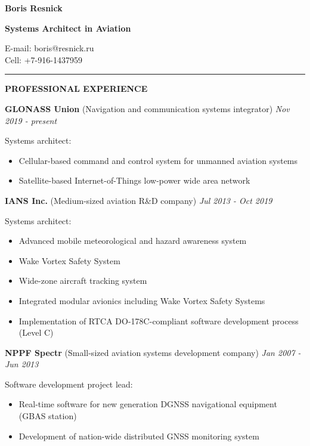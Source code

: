\documentclass[a4paper]{article}
\begin{document}
    \thispagestyle{empty}
    
	\begin{center}
		{\Large \textbf{Boris Resnick}\par}
		\vspace{2mm}
		{\large \textbf{Systems Architect in Aviation}\par}
		E-mail: boris@resnick.ru\\
		Cell: +7-916-1437959
	\end{center}
	\vspace{-2mm}
	\rule{\textwidth}{1pt}
	\vspace{2mm}

	\textbf{PROFESSIONAL EXPERIENCE}
	\vspace{4mm}

	\textbf{GLONASS Union} (Navigation and communication systems integrator) \hfill \textit{Nov 2019 - present}
	
    Systems architect:
	\begin{itemize}
	    \item Cellular-based command and control system for unmanned aviation systems
        \item Satellite-based Internet-of-Things low-power wide area network
    \end{itemize}
    \vspace{3mm}
    
    \textbf{IANS Inc.} (Medium-sized aviation R\&D company) \hfill \textit{ Jul 2013 - Oct 2019}
    
    Systems architect:
	\begin{itemize}
	    \item Advanced mobile meteorological and hazard awareness system
	    \item Wake Vortex Safety System
	    \item Wide-zone aircraft tracking system
	    \item Integrated modular avionics including Wake Vortex Safety Systems
	    \item Implementation of RTCA DO-178C-compliant software development process (Level C)
    \end{itemize}
    \vspace{3mm}
    
    \textbf{NPPF Spectr} (Small-sized aviation systems development company) \hfill \textit{Jan 2007 - Jun 2013}
    
    Software development project lead:
	\begin{itemize}
	    \item Real-time software for new generation DGNSS navigational equipment (GBAS station)
	    \item Development of nation-wide distributed GNSS monitoring system
    \end{itemize}
    \vspace{3mm}
    
\end{document}
